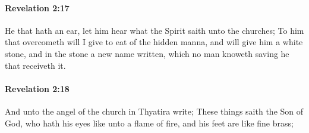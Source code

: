 		\paragraph{Revelation 2:17} %
			\label{REVELATIONNT-2-17}

			He that hath an ear, let him hear what the Spirit saith unto the churches; To him that overcometh will I give to eat of the hidden manna, and will give him a white stone, and in the stone a new name written, which no man knoweth saving he that receiveth it.

			\begin{framed}
			\scriptsize
				\begin{compactdesc}
					\item[SBLG] 
				\end{compactdesc}
			\end{framed}

		\paragraph{Revelation 2:18} %
			\label{REVELATIONNT-2-18}

			And unto the angel of the church in Thyatira write; These things saith the Son of God, who hath his eyes like unto a flame of fire, and his feet are like fine brass;

